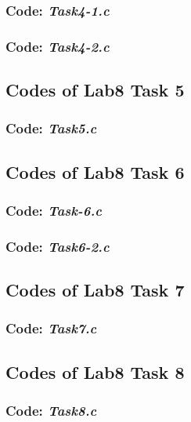 \subsubsection*{Code: \textit{Task4-1.c}}

\newpage

\subsubsection*{Code: \textit{Task4-2.c}}

\newpage

\subsection*{Codes of Lab8 Task 5}
\subsubsection*{Code: \textit{Task5.c}}

\newpage


\subsection*{Codes of Lab8 Task 6}
\subsubsection*{Code: \textit{Task-6.c}}

\newpage

\subsubsection*{Code: \textit{Task6-2.c}}

\newpage


\subsection*{Codes of Lab8 Task 7}
\subsubsection*{Code: \textit{Task7.c}}

\newpage


\subsection*{Codes of Lab8 Task 8}
\subsubsection*{Code: \textit{Task8.c}}

\newpage

